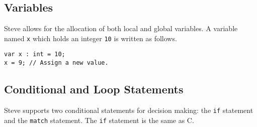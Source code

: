 %
%
%
% 
%
%
%

\subsection{Variables} \label{tut:variable}

Steve allows for the allocation of both local and global variables. 
A variable named \texttt{x} which holds an integer \texttt{10} is written
as follows. 

\begin{lstlisting}
var x : int = 10;
x = 9; // Assign a new value.
\end{lstlisting}

\subsection{Conditional and Loop Statements} \label{tut:condition}

Steve supports two conditional statements for decision making: the \texttt{if} statement and the \texttt{match} statement. 
The \texttt{if} statement is the same as C.

